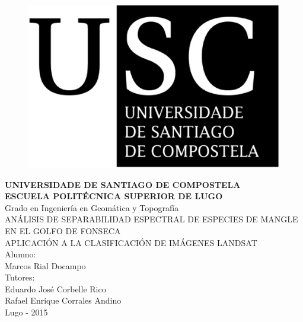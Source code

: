 




\begin{figure}[t]
\centering
\includegraphics[scale=0.2]{./Imagenes/USCbn.eps} %
\end{figure}

\begin{center}
\textbf{{\Huge UNIVERSIDADE DE SANTIAGO DE COMPOSTELA}\\[1cm]
{\LARGE ESCUELA POLITÉCNICA SUPERIOR DE LUGO}}\\[2cm]
{\Large Grado en Ingeniería en Geomática y Topografía}\\[3cm]
{\Large ANÁLISIS DE SEPARABILIDAD ESPECTRAL DE ESPECIES DE MANGLE EN EL GOLFO DE FONSECA}\\
{\Large APLICACIÓN A LA CLASIFICACIÓN DE IMÁGENES LANDSAT}\\[2cm]
{\normalsize \vfill{Alumno:\\Marcos Rial Docampo\\Tutores:\\Eduardo José Corbelle Rico\\Rafael Enrique Corrales Andino}}\\
{\footnotesize \vfill{Lugo - 2015%
}}
\end{center}